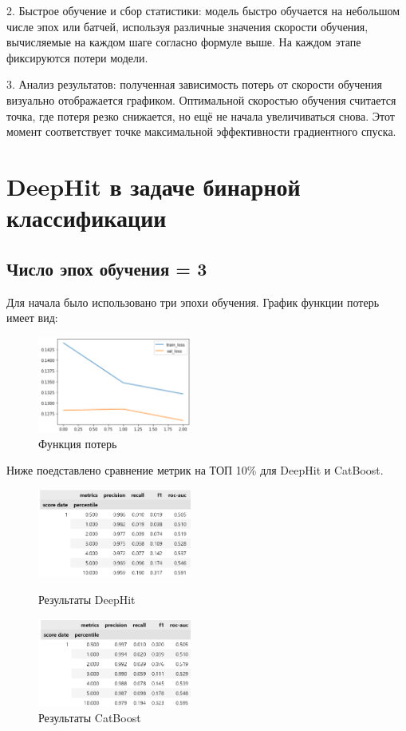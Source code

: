 \documentclass[a4paper,14pt,oneside,openany]{memoir}
\begin{document}
2. Быстрое обучение и сбор статистики: модель быстро обучается на небольшом числе эпох или батчей, используя различные значения скорости обучения, вычисляемые на каждом шаге согласно формуле выше. На каждом этапе фиксируются потери модели.

3. Анализ результатов: полученная зависимость потерь от скорости обучения визуально отображается графиком. Оптимальной скоростью обучения считается точка, где потеря резко снижается, но ещё не начала увеличиваться снова. Этот момент соответствует точке максимальной эффективности градиентного спуска.



\section{DeepHit в задаче бинарной классификации}



\subsection{Число эпох обучения = 3}

Для начала было использовано три эпохи обучения. График функции потерь имеет вид:

\begin{figure}[H]
	\includegraphics[width=0.45\textwidth]{../figures/deephit_losses_3_epoch.png}
	\caption{Функция потерь}
\end{figure}

Ниже поедставлено сравнение метрик на ТОП 10\% для DeepHit и CatBoost. 

\begin{figure}[H]
	\includegraphics[width=0.45\textwidth]{../figures/deephit_reports_3_epoch.png}
	\caption{Результаты DeepHit}
	\includegraphics[width=0.45\textwidth]{../figures/catboost_reports.png}
	\caption{Результаты CatBoost}
\end{figure}
\end{document}
